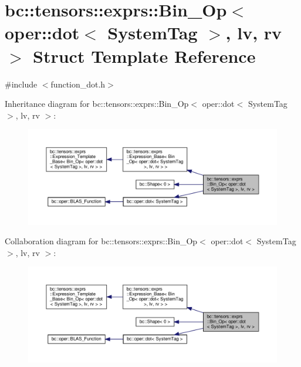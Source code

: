 \hypertarget{structbc_1_1tensors_1_1exprs_1_1Bin__Op_3_01oper_1_1dot_3_01SystemTag_01_4_00_01lv_00_01rv_01_4}{}\section{bc\+:\+:tensors\+:\+:exprs\+:\+:Bin\+\_\+\+Op$<$ oper\+:\+:dot$<$ System\+Tag $>$, lv, rv $>$ Struct Template Reference}
\label{structbc_1_1tensors_1_1exprs_1_1Bin__Op_3_01oper_1_1dot_3_01SystemTag_01_4_00_01lv_00_01rv_01_4}


{\ttfamily \#include $<$function\+\_\+dot.\+h$>$}



Inheritance diagram for bc\+:\+:tensors\+:\+:exprs\+:\+:Bin\+\_\+\+Op$<$ oper\+:\+:dot$<$ System\+Tag $>$, lv, rv $>$\+:\nopagebreak
\begin{figure}[H]
\begin{center}
\leavevmode
\includegraphics[width=350pt]{structbc_1_1tensors_1_1exprs_1_1Bin__Op_3_01oper_1_1dot_3_01SystemTag_01_4_00_01lv_00_01rv_01_4__inherit__graph}
\end{center}
\end{figure}


Collaboration diagram for bc\+:\+:tensors\+:\+:exprs\+:\+:Bin\+\_\+\+Op$<$ oper\+:\+:dot$<$ System\+Tag $>$, lv, rv $>$\+:\nopagebreak
\begin{figure}[H]
\begin{center}
\leavevmode
\includegraphics[width=350pt]{structbc_1_1tensors_1_1exprs_1_1Bin__Op_3_01oper_1_1dot_3_01SystemTag_01_4_00_01lv_00_01rv_01_4__coll__graph}
\end{center}
\end{figure}
